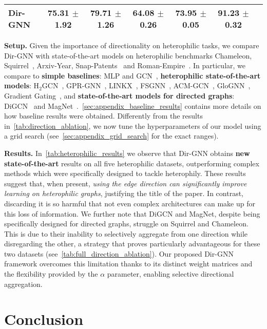 \documentclass{article}
\newcommand\oursacro{Dir-GNN}
\theoremstyle{plain}
\theoremstyle{definition}
\theoremstyle{remark}
\begin{document}
\begin{table*}[t]
\begin{center}
\begin{small}
\begin{sc}
{\begin{tabular}{lcccccr}
\hdashline
\oursacro{}  &  \textbf{75.31 $\pm$ 1.92}  &  \textbf{79.71 $\pm$ 1.26}  &  \textbf{64.08 $\pm$ 0.26}  &  \textbf{73.95 $\pm$ 0.05}  &  \textbf{91.23 $\pm$ 0.32} \\
\bottomrule
\end{tabular}}
\end{sc}
\end{small}
\end{center}
\caption{Results on real-world directed heterophilic datasets. OOM indicates out of memory. }
\label{tab:heterophilic_results}
\end{table*}
 
\textbf{Setup.} Given the importance of directionality on heterophilic tasks, we compare Dir-GNN with state-of-the-art models on heterophilic benchmarks Chameleon, Squirrel~\cite{pei2020geom}, Arxiv-Year, Snap-Patents~\cite{lim2021large} and Roman-Empire~\cite{platonov2023a}. In particular, we compare to \textbf{simple baselines}: MLP and GCN~\cite{kipf2016semi}, \textbf{heterophilic state-of-the-art models}: H$_2$GCN~\cite{zhu2020beyond}, GPR-GNN~\cite{chien2020adaptive}, LINKX~\cite{lim2021large}, FSGNN~\cite{maurya2021improving}, ACM-GCN~\cite{luan2022revisiting}, GloGNN~\cite{li2022finding}, Gradient Gating~\cite{rusch2022gradient}, and \textbf{state-of-the-art models for directed graphs}: DiGCN~\cite{digraph} and MagNet~\cite{zhang2021magnet}.~\cref{sec:appendix_baseline_results} contains more details on how baseline results were obtained. Differently from the results in~\cref{tab:direction_ablation}, we now tune the hyperparameters of our model using a grid search (see~\cref{sec:appendix_grid_search} for the exact ranges).


\textbf{Results.} In~\cref{tab:heterophilic_results} we observe that \oursacro{} obtains {\bf new state-of-the-art} results on all five heterophilic datasets, outperforming complex methods which were specifically designed to tackle heterophily. These results suggest that, when present, {\em using the edge direction can significantly improve learning on heterophilic graphs}, justifying the title of the paper. In contrast, discarding it is so harmful that not even complex architectures can make up for this loss of information. We further note that DiGCN and MagNet, despite being specifically designed for directed graphs, struggle on Squirrel and Chameleon. This is due to their inability to selectively aggregate from one direction while disregarding the other, a strategy that proves particularly advantageous for these two datasets (see~\cref{tab:full_direction_ablation}). Our proposed \oursacro{} framework overcomes this limitation thanks to its distinct weight matrices and the flexibility provided by the $\alpha$ parameter, enabling selective directional aggregation. \section{Conclusion}
\label{sec:conclusion}
\end{document}
